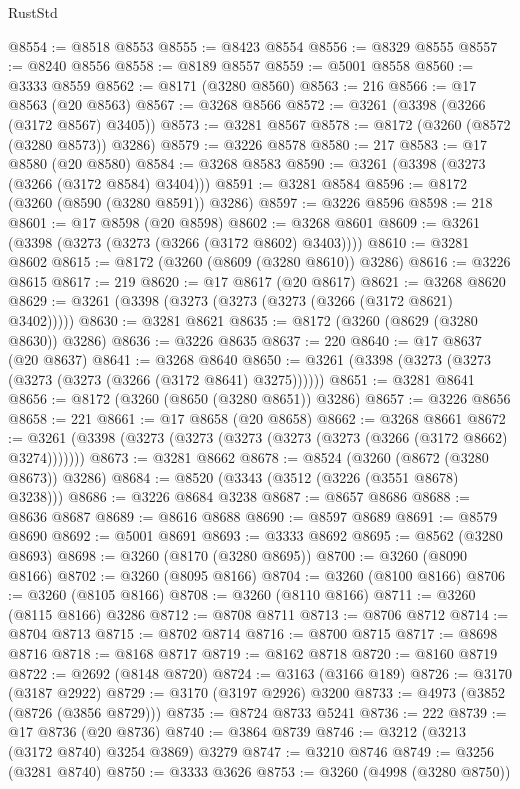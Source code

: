 \begin{lexlean}{RustStd}
\begin{coremodule}
{\begin{coremodule}
{{{{{{{{{{{{{{{{{{{{{{{{{{@8554 := @8518 @8553
@8555 := @8423 @8554
@8556 := @8329 @8555
@8557 := @8240 @8556
@8558 := @8189 @8557
@8559 := @5001 @8558
@8560 := @3333 @8559
@8562 := @8171 (@3280 @8560)
@8563 := 216
@8566 := @17 @8563 (@20 @8563)
@8567 := @3268 @8566
@8572 := @3261 (@3398 (@3266 (@3172 @8567) @3405))
@8573 := @3281 @8567
@8578 := @8172 (@3260 (@8572 (@3280 @8573)) @3286)
@8579 := @3226 @8578
@8580 := 217
@8583 := @17 @8580 (@20 @8580)
@8584 := @3268 @8583
@8590 := @3261 (@3398 (@3273 (@3266 (@3172 @8584) @3404)))
@8591 := @3281 @8584
@8596 := @8172 (@3260 (@8590 (@3280 @8591)) @3286)
@8597 := @3226 @8596
@8598 := 218
@8601 := @17 @8598 (@20 @8598)
@8602 := @3268 @8601
@8609 := @3261 (@3398 (@3273 (@3273 (@3266 (@3172 @8602) @3403))))
@8610 := @3281 @8602
@8615 := @8172 (@3260 (@8609 (@3280 @8610)) @3286)
@8616 := @3226 @8615
@8617 := 219
@8620 := @17 @8617 (@20 @8617)
@8621 := @3268 @8620
@8629 := @3261 (@3398 (@3273 (@3273 (@3273 (@3266 (@3172 @8621) @3402)))))
@8630 := @3281 @8621
@8635 := @8172 (@3260 (@8629 (@3280 @8630)) @3286)
@8636 := @3226 @8635
@8637 := 220
@8640 := @17 @8637 (@20 @8637)
@8641 := @3268 @8640
@8650 := @3261 (@3398 (@3273 (@3273 (@3273 (@3273 (@3266 (@3172 @8641) @3275))))))
@8651 := @3281 @8641
@8656 := @8172 (@3260 (@8650 (@3280 @8651)) @3286)
@8657 := @3226 @8656
@8658 := 221
@8661 := @17 @8658 (@20 @8658)
@8662 := @3268 @8661
@8672 := @3261 (@3398 (@3273 (@3273 (@3273 (@3273 (@3273 (@3266 (@3172 @8662) @3274)))))))
@8673 := @3281 @8662
@8678 := @8524 (@3260 (@8672 (@3280 @8673)) @3286)
@8684 := @8520 (@3343 (@3512 (@3226 (@3551 @8678) @3238)))
@8686 := @3226 @8684 @3238
@8687 := @8657 @8686
@8688 := @8636 @8687
@8689 := @8616 @8688
@8690 := @8597 @8689
@8691 := @8579 @8690
@8692 := @5001 @8691
@8693 := @3333 @8692
@8695 := @8562 (@3280 @8693)
@8698 := @3260 (@8170 (@3280 @8695))
@8700 := @3260 (@8090 @8166)
@8702 := @3260 (@8095 @8166)
@8704 := @3260 (@8100 @8166)
@8706 := @3260 (@8105 @8166)
@8708 := @3260 (@8110 @8166)
@8711 := @3260 (@8115 @8166) @3286
@8712 := @8708 @8711
@8713 := @8706 @8712
@8714 := @8704 @8713
@8715 := @8702 @8714
@8716 := @8700 @8715
@8717 := @8698 @8716
@8718 := @8168 @8717
@8719 := @8162 @8718
@8720 := @8160 @8719
@8722 := @2692 (@8148 @8720)
@8724 := @3163 (@3166 @189)
@8726 := @3170 (@3187 @2922)
@8729 := @3170 (@3197 @2926) @3200
@8733 := @4973 (@3852 (@8726 (@3856 @8729)))
@8735 := @8724 @8733 @5241
@8736 := 222
@8739 := @17 @8736 (@20 @8736)
@8740 := @3864 @8739
@8746 := @3212 (@3213 (@3172 @8740) @3254 @3869) @3279
@8747 := @3210 @8746
@8749 := @3256 (@3281 @8740)
@8750 := @3333 @3626
@8753 := @3260 (@4998 (@3280 @8750))
}}}}}}}}}}}}}}}}}}}}}}}}}}
\end{coremodule}}
\end{coremodule}
\end{lexlean}
